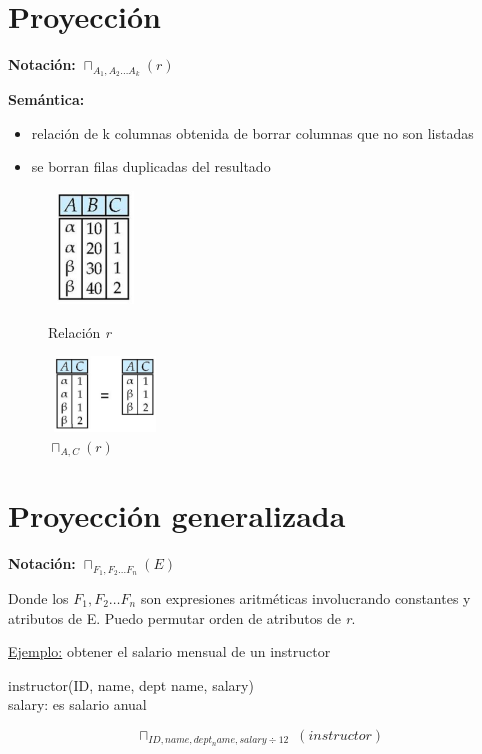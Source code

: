 \documentclass[12pt,a4paper]{report}
\begin{document}
	\pagebreak
	\section{Proyección}
		\par \textbf{Notación:} $\sqcap_{A_{1}, A_{2} \dotsc A_{k}}(r)$
		\vspace{3mm}
		\par \textbf{Semántica:}
		\begin{itemize}
			\item relación de k columnas obtenida de borrar columnas que no son listadas
			\item se borran filas duplicadas del resultado
		\end{itemize}
		
		\begin{figure}[htb]
				\centering
				\includegraphics[width=2.5cm, height=3cm]{./imagenes/proyeccion1.png}
				\caption{Relación \textit{r}}
				\vspace{5mm}
				\includegraphics[width=3cm, height=2cm]{./imagenes/proyeccion2.png}
				\caption{$\sqcap_{A, C}(r)$}
		\end{figure}
	
	\section{Proyección generalizada}
		\par \textbf{Notación:} $\sqcap_{F_{1}, F_{2} \dotsc F_{n}}(E)$
		\par Donde los $F_{1}, F_{2} \dotsc F_{n}$ son expresiones aritméticas involucrando constantes y atributos de E. Puedo permutar orden de atributos de \textit{r}.
		
		\vspace{5mm}
		\par \underline{Ejemplo:} obtener el salario mensual de un instructor
		\begin{center} instructor(ID, name, dept name, salary) \\ salary: es salario anual \end{center}
		\[\sqcap_{ID, name, dept_name, salary \div 12} \; (instructor)\]
\end{document}
